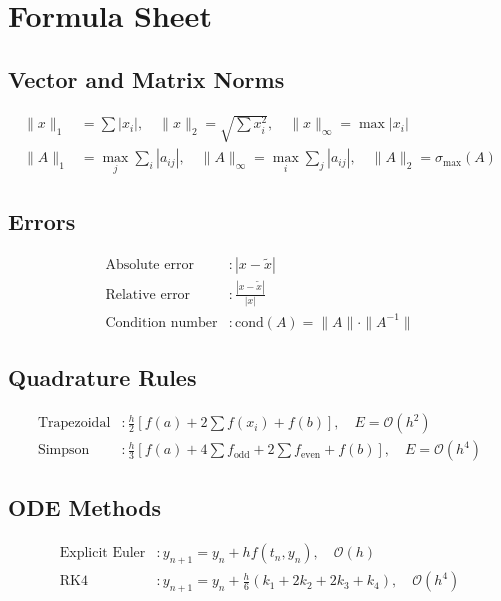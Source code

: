 \documentclass[12pt,a4paper,twoside]{book}
\theoremstyle{definition}
\theoremstyle{plain}
\theoremstyle{remark}
\newcommand{\cond}{\mathrm{cond}}
\newcommand{\BigO}{\mathcal{O}}
\begin{document}
\mainmatter












\backmatter
\appendix
\chapter{Formula Sheet}
\label{app:formulas}

\section{Vector and Matrix Norms}
\begin{align}
\|x\|_1 &= \sum|x_i|, \quad \|x\|_2=\sqrt{\sum x_i^2}, \quad \|x\|_\infty=\max|x_i| \\
\|A\|_1 &= \max_j\sum_i|a_{ij}|, \quad \|A\|_\infty=\max_i\sum_j|a_{ij}|, \quad \|A\|_2=\sigma_{\max}(A)
\end{align}

\section{Errors}
\begin{align}
\text{Absolute error} &: |x-\tilde{x}| \\
\text{Relative error} &: \frac{|x-\tilde{x}|}{|x|} \\
\text{Condition number} &: \cond(A)=\|A\|\cdot\|A^{-1}\|
\end{align}

\section{Quadrature Rules}
\begin{align}
\text{Trapezoidal} &: \frac{h}{2}[f(a)+2\sum f(x_i)+f(b)], \quad E=\BigO(h^2) \\
\text{Simpson} &: \frac{h}{3}[f(a)+4\sum f_{\text{odd}}+2\sum f_{\text{even}}+f(b)], \quad E=\BigO(h^4)
\end{align}

\section{ODE Methods}
\begin{align}
\text{Explicit Euler} &: y_{n+1}=y_n+hf(t_n,y_n), \quad \BigO(h) \\
\text{RK4} &: y_{n+1}=y_n+\tfrac{h}{6}(k_1+2k_2+2k_3+k_4), \quad \BigO(h^4)
\end{align}
\end{document}
